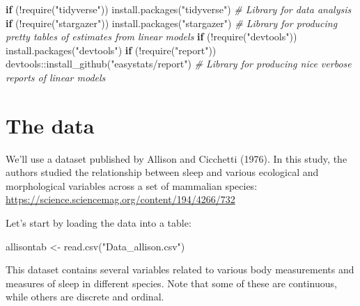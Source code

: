 \documentclass[
]{book}
\newenvironment{Shaded}{\begin{snugshade}}{\end{snugshade}}
\newcommand{\CommentTok}[1]{\textcolor[rgb]{0.56,0.35,0.01}{\textit{#1}}}
\newcommand{\ControlFlowTok}[1]{\textcolor[rgb]{0.13,0.29,0.53}{\textbf{#1}}}
\newcommand{\FunctionTok}[1]{\textcolor[rgb]{0.00,0.00,0.00}{#1}}
\newcommand{\NormalTok}[1]{#1}
\newcommand{\OtherTok}[1]{\textcolor[rgb]{0.56,0.35,0.01}{#1}}
\newcommand{\SpecialCharTok}[1]{\textcolor[rgb]{0.00,0.00,0.00}{#1}}
\newcommand{\StringTok}[1]{\textcolor[rgb]{0.31,0.60,0.02}{#1}}
\begin{document}
\begin{Shaded}
\begin{Highlighting}[]
\ControlFlowTok{if}\NormalTok{ (}\SpecialCharTok{!}\FunctionTok{require}\NormalTok{(}\StringTok{"tidyverse"}\NormalTok{)) }\FunctionTok{install.packages}\NormalTok{(}\StringTok{"tidyverse"}\NormalTok{) }\CommentTok{\# Library for data analysis}
\ControlFlowTok{if}\NormalTok{ (}\SpecialCharTok{!}\FunctionTok{require}\NormalTok{(}\StringTok{"stargazer"}\NormalTok{)) }\FunctionTok{install.packages}\NormalTok{(}\StringTok{"stargazer"}\NormalTok{) }\CommentTok{\# Library for producing pretty tables of estimates from linear models}
\ControlFlowTok{if}\NormalTok{ (}\SpecialCharTok{!}\FunctionTok{require}\NormalTok{(}\StringTok{"devtools"}\NormalTok{)) }\FunctionTok{install.packages}\NormalTok{(}\StringTok{"devtools"}\NormalTok{)}
\ControlFlowTok{if}\NormalTok{ (}\SpecialCharTok{!}\FunctionTok{require}\NormalTok{(}\StringTok{"report"}\NormalTok{)) devtools}\SpecialCharTok{::}\FunctionTok{install\_github}\NormalTok{(}\StringTok{"easystats/report"}\NormalTok{) }\CommentTok{\# Library for producing nice verbose reports of linear models}
\end{Highlighting}
\end{Shaded}

\hypertarget{the-data-1}{%
\section{The data}\label{the-data-1}}

We'll use a dataset published by Allison and Cicchetti (1976). In this study, the authors studied the relationship between sleep and various ecological and morphological variables across a set of mammalian species: \url{https://science.sciencemag.org/content/194/4266/732}

Let's start by loading the data into a table:

\begin{Shaded}
\begin{Highlighting}[]
\NormalTok{allisontab }\OtherTok{\textless{}{-}} \FunctionTok{read.csv}\NormalTok{(}\StringTok{"Data\_allison.csv"}\NormalTok{)}
\end{Highlighting}
\end{Shaded}

This dataset contains several variables related to various body measurements and measures of sleep in different species. Note that some of these are continuous, while others are discrete and ordinal.
\end{document}
